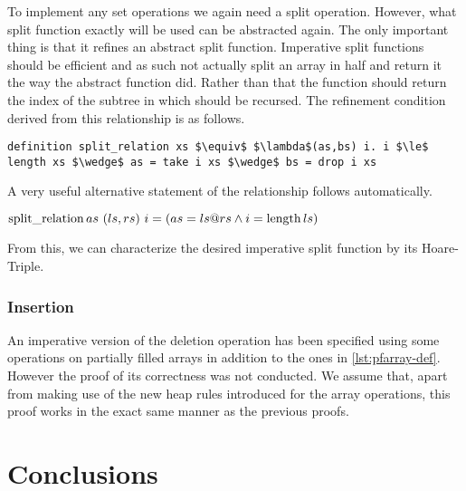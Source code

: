 To implement any set operations we again need a split operation.
However, what split function exactly will be used can be abstracted again.
The only important thing is that it refines an abstract split function.
Imperative split functions should be efficient and as such not actually
split an array in half and return it the way the abstract function did.
Rather than that the function should return the index of the subtree
in which should be recursed.
The refinement condition derived from this relationship is as follows.

\begin{lstlisting}[mathescape=true, language=Isabelle]
definition split_relation xs $\equiv$ $\lambda$(as,bs) i. i $\le$ length xs $\wedge$ as = take i xs $\wedge$ bs = drop i xs
\end{lstlisting}

A very useful alternative statement of the relationship follows automatically.

\begin{lemma}
    $\operatorname{split\_relation} as\ (ls,rs)\ i = (as = ls@rs \wedge i = \operatorname{length} ls)$
\end{lemma}

From this, we can characterize the desired imperative
split function by its Hoare-Triple.


\subsection{Insertion}


An imperative version of the deletion operation has been specified
using some operations on partially filled arrays in addition to 
the ones in \autoref{lst:pfarray-def}.
However the proof of its correctness was not conducted.
We assume that, apart from making use of the new
heap rules introduced for the array operations,
this proof works in the exact same manner as
the previous proofs.

\chapter{Conclusions}


